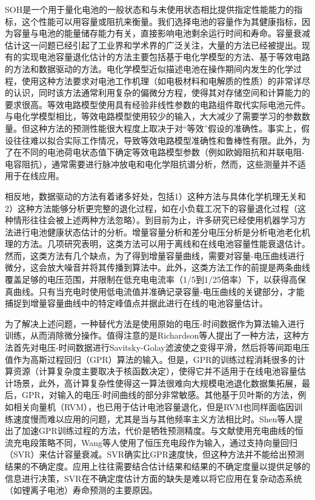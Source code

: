 \documentclass{article}
\begin{document}
SOH是一个用于量化电池的一般状态和与未使用状态相比提供指定性能能力的指标，这个性能可以用容量或阻抗来衡量。我们选择电池的容量作为其健康指标，因为容量与电池的能量储存能力有关，直接影响电池剩余运行时间和寿命。容量衰减估计这一问题已经引起了工业界和学术界的广泛关注\cite{Barré2013, Zhang2011, Farmann2015, Hannan2017}，大量的方法已经被提出。现有的实现电池容量退化估计的方法主要包括基于电化学模型的方法\cite{Hu2012, Feng2015, Andre2011}、基于等效电路的方法\cite{ref11, ref12, Prasad2013}和数据驱动的方法\cite{Severson2019, Saha2008, Goebel2008, Hu2015, Klass2014, Attia2020}。电化学模型近似描述电池在操作期间内发生的化学过程，使用这种方法要求对电池工作机理（如电极材料和电解质的性质）的非常详尽的认识，同时该方法通常利用复杂的偏微分方程，使得其对存储空间和计算能力的要求很高。等效电路模型使用具有经验非线性参数的电路组件取代实际电池元件\cite{Feng2015}。与电化学模型相比，等效电路模型使用较少的输入，大大减少了需要学习的参数数量。但这种方法的预测性能很大程度上取决于对“等效”假设的准确性。事实上，假设往往难以拟合实际工作情况，导致等效电路模型准确性和鲁棒性有限\cite{Hu2012}。此外，为了在不同的电池荷电状态值下确定等效电路模型参数（例如欧姆阻抗和并联电阻-电容阻抗），通常需要进行脉冲放电\cite{Coleman2008}和电化学阻抗谱分析\cite{Andre2011, Waag2013, Tröltzsch2006}，然而，这些测量并不适用于在线应用。

相反地，数据驱动的方法有着诸多好处，包括1）这种方法与具体化学机理无关和2）这种方法能够分析更完整的退化过程，如在小负载工况下的容量退化过程（这种情形往往会被上述两种方法忽略）。到目前为止，许多研究已经使用机器学习方法进行电池健康状态估计的分析。增量容量分析和差分电压分析是分析电池老化机理的方法\cite{Birkl2017}。几项研究表明\cite{Birkl2017, Li2019, Li2018a, ref26, Feng2019}，这类方法可以用于离线和在线电池容量性能衰退估计。然而，这类方法有几个缺点，为了得到增量容量曲线，需要对容量-电压曲线进行微分，这会放大噪音并将其传播到算法中。此外，这类方法工作的前提是两条曲线覆盖足够的电压范围，并限制在低充电电流率（1/5到1/25倍率）下\cite{Li2018b, Dubarry2006, Weng2013}，以获得高保真曲线。只有当充电时使用低电流值并准确记录容量-电压曲线的关键部分，才能捕捉到增量容量曲线中的特定峰值点并据此进行在线的电池容量估计。

为了解决上述问题，一种替代方法是使用原始的电压-时间数据作为算法输入进行训练，从而消除微分操作\cite{Yang2018, Richardson2018}。值得注意的是Richardson等人提出了一种方法\cite{Richardson2018}，这种方法首先对电压-时间数据进行Savitsky-Golay滤波使之变得平滑，然后将等间距电压值作为高斯过程回归（GPR）算法的输入。但是，GPR的训练过程消耗很多的计算资源（计算复杂度主要取决于核函数决定）\cite{ref33}，使得它并不适用于在线电池容量估计场景，此外，高计算复杂性使得这一算法很难向大规模电池退化数据集拓展，最后，GPR，对输入的电压-时间曲线的部分非常敏感。其他基于贝叶斯的方法，例如相关向量机（RVM）\cite{ref34}，也已用于估计电池容量退化，但是RVM也同样面临因训练速度慢而难以应用的问题，尤其是当与其他频率主义方法相比时\cite{Ben-Shimon2006}。Shen\cite{ref33}等人提出了加速GPR训练过程的方法，代价是牺牲预测精度。与文献\cite{Richardson2018}使用充电曲线的恒流充电段策略不同，Wang等人\cite{Wang2018}使用了恒压充电段作为输入，通过支持向量回归（SVR）来估计容量衰减。SVR确实比GPR速度快，但这种方法并不能给出预测结果的不确定度。应用上往往需要结合估计结果和结果的不确定度量以提供足够的信息进行决策，SVR在不确定度估计方面的缺失是难以将它应用在复杂动态系统（如锂离子电池）寿命预测的主要原因\cite{ref37}。
\end{document}
